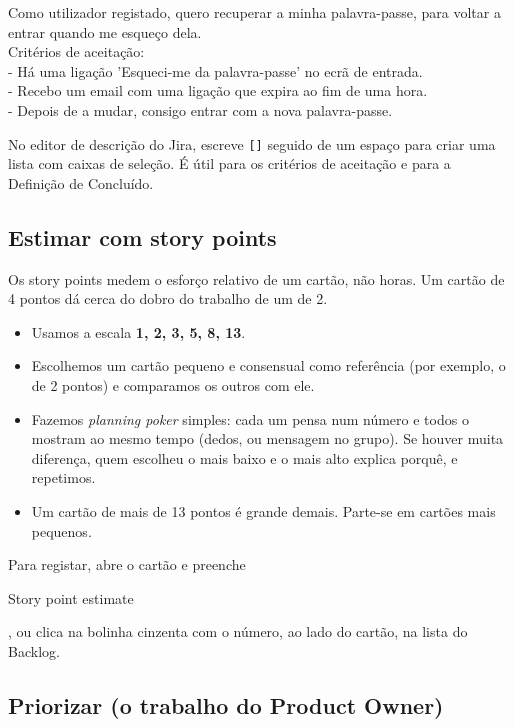 \documentclass[11pt,a4paper]{article}
\newcommand{\btn}[1]{{\setlength{\fboxsep}{1.6pt}\colorbox{azulclaro}{\sffamily\small\strut #1}}}
\begin{document}
\begin{codigo}
Como utilizador registado, quero recuperar a minha palavra-passe, para voltar a entrar quando me esqueço dela.\\[4pt]
Critérios de aceitação:\\
- Há uma ligação 'Esqueci-me da palavra-passe' no ecrã de entrada.\\
- Recebo um email com uma ligação que expira ao fim de uma hora.\\
- Depois de a mudar, consigo entrar com a nova palavra-passe.
\end{codigo}

\begin{tcolorbox}[dica, title={Dica: caixas de verificação}]
  No editor de descrição do Jira, escreve \texttt{[]} seguido de um espaço para criar uma lista com caixas de seleção. É útil para os critérios de aceitação e para a Definição de Concluído.
\end{tcolorbox}

\subsection{Estimar com story points}

Os story points medem o esforço relativo de um cartão, não horas. Um cartão de 4 pontos dá cerca do dobro do trabalho de um de 2.

\begin{itemize}
  \item Usamos a escala \textbf{1, 2, 3, 5, 8, 13}.
  \item Escolhemos um cartão pequeno e consensual como referência (por exemplo, o de 2 pontos) e comparamos os outros com ele.
  \item Fazemos \textit{planning poker} simples: cada um pensa num número e todos o mostram ao mesmo tempo (dedos, ou mensagem no grupo). Se houver muita diferença, quem escolheu o mais baixo e o mais alto explica porquê, e repetimos.
  \item Um cartão de mais de 13 pontos é grande demais. Parte-se em cartões mais pequenos.
\end{itemize}

Para registar, abre o cartão e preenche \btn{Story point estimate}, ou clica na bolinha cinzenta com o número, ao lado do cartão, na lista do Backlog.

\subsection{Priorizar (o trabalho do Product Owner)}
\end{document}
